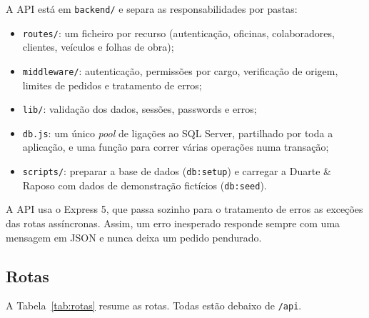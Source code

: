 \documentclass[a4paper,12pt]{article}
\begin{document}
A \ac{API} está em \texttt{backend/} e separa as responsabilidades por pastas:
\begin{itemize}
    \item \texttt{routes/}: um ficheiro por recurso (autenticação, oficinas, colaboradores, clientes, veículos e folhas de obra);
    \item \texttt{middleware/}: autenticação, permissões por cargo, verificação de origem, limites de pedidos e tratamento de erros;
    \item \texttt{lib/}: validação dos dados, sessões, passwords e erros;
    \item \texttt{db.js}: um único \textit{pool} de ligações ao SQL Server, partilhado por toda a aplicação, e uma função para correr várias operações numa transação;
    \item \texttt{scripts/}: preparar a base de dados (\texttt{db:setup}) e carregar a Duarte \& Raposo com dados de demonstração fictícios (\texttt{db:seed}).
\end{itemize}

A \ac{API} usa o Express 5, que passa sozinho para o tratamento de erros as exceções das rotas assíncronas. Assim, um erro inesperado responde sempre com uma mensagem em JSON e nunca deixa um pedido pendurado.

\subsection{Rotas}

A Tabela~\ref{tab:rotas} resume as rotas. Todas estão debaixo de \texttt{/api}.
\end{document}
